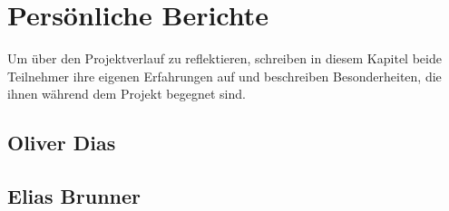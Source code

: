 \section{Persönliche Berichte}
Um über den Projektverlauf zu reflektieren, schreiben in diesem Kapitel beide Teilnehmer ihre eigenen Erfahrungen auf und beschreiben Besonderheiten, die ihnen während dem Projekt begegnet sind. 

\subsection{Oliver Dias}

\subsection{Elias Brunner}



